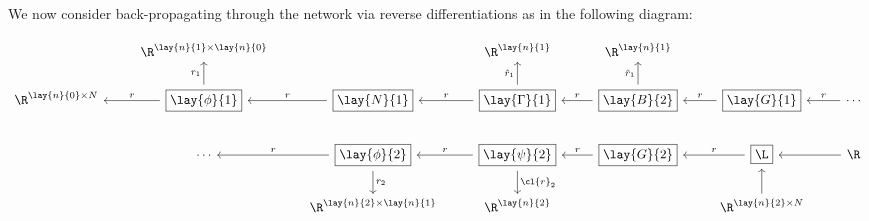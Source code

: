 We now consider back-propagating through the network via reverse differentiations as in the following diagram:


{\tiny
\begin{equation*}
	\begin{tikzcd}
		{}
		&\R^{\lay{n}{1}\times\lay{n}{0}}
		&{}
		&\R^{\lay{n}{1}}
		&\R^{\lay{n}{1}}
		&{}
		\\
		\R^{\lay{n}{0}\times N}
		&\boxed{\lay{\phi}{1}}
		\arrow[l, swap, "r"]
		\arrow[u, "r_1"]
		&\boxed{\lay{N}{1}}
		\arrow[l, swap, "r"]
		&\boxed{\lay{\Gamma}{1}}
		\arrow[l, swap, "r"]
		\arrow[u, "\hat{r}_1"]
		&\boxed{\lay{B}{2}}
		\arrow[l, swap, "r"]
		\arrow[u, "\tilde{r}_1"]
		&\boxed{\lay{G}{1}}
		\arrow[l, swap, "r"]
		&\cdots
		\arrow[l, swap, "r"]
		\\
		{}
		&\cdots
		&\boxed{\lay{\phi}{2}}
		\arrow[l, swap, "r"]
		\arrow[d, "r_2"]
		&\boxed{\lay{\psi}{2}}
		\arrow[l, swap, "r"]
		\arrow[d, "\cl{r}_2"]
		&\boxed{\lay{G}{2}}
		\arrow[l, swap, "r"]
		&\boxed{\L}
		\arrow[l, swap, "r"]
		&\R
		\arrow[l]
		\\
		{}
		&{}
		&\R^{\lay{n}{2}\times\lay{n}{1}}
		&\R^{\lay{n}{2}}
		&{}
		&\R^{\lay{n}{2}\times N}
		\arrow[u]
		&{}
	\end{tikzcd}
\end{equation*}
}

